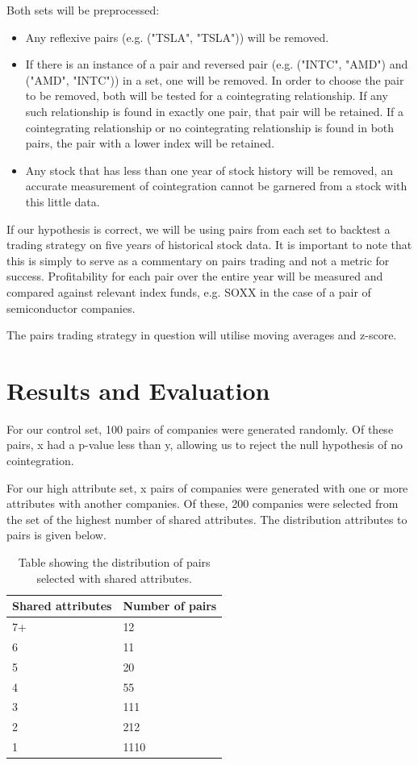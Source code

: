 \documentclass{UoYCSproject}
\begin{document}
Both sets will be preprocessed:
\begin{itemize}
    \item Any reflexive pairs (e.g. ("TSLA", "TSLA")) will be removed.
    \item If there is an instance of a pair and reversed pair (e.g. ("INTC", "AMD") and ("AMD", "INTC")) in a set, one will be removed. In order to choose the pair to be removed, both will be tested for a cointegrating relationship. If any such relationship is found in exactly one pair, that pair will be retained. If a cointegrating relationship or no cointegrating relationship is found in both pairs, the pair with a lower index will be retained.
    \item Any stock that has less than one year of stock history will be removed, an accurate measurement of cointegration cannot be garnered from a stock with this little data.
\end{itemize}

If our hypothesis is correct, we will be using pairs from each set to backtest a trading strategy on five years of historical stock data. It is important to note that this is simply to serve as a commentary on pairs trading and not a metric for success. Profitability for each pair over the entire year will be measured and compared against relevant index funds, e.g. SOXX in the case of a pair of semiconductor companies.

The pairs trading strategy in question will utilise moving averages and z-score.

\chapter{Results and Evaluation}
\label{cha:Results and Evaluation}

For our control set, 100 pairs of companies were generated randomly. Of these pairs, x had a p-value less than y, allowing us to reject the null hypothesis of no cointegration.

For our high attribute set, x pairs of companies were generated with one or more attributes with another companies. Of these, 200 companies were selected from the set of the highest number of shared attributes. The distribution attributes to pairs is given below.

\begin{table}[h]
\begin{center}
\begin{tabular}{|p{}|p{}|}
\hline
Shared attributes & Number of pairs \\\hline
7+ &
12 \\\hline
6 &
11 \\\hline
5 &
20 \\\hline
4 &
55 \\\hline
3 &
111 \\\hline
2 &
212 \\\hline
1 &
1110 \\\hline
\end{tabular}
\end{center}
\caption{Table showing the distribution of pairs selected with shared attributes.}
\end{table}
\end{document}
